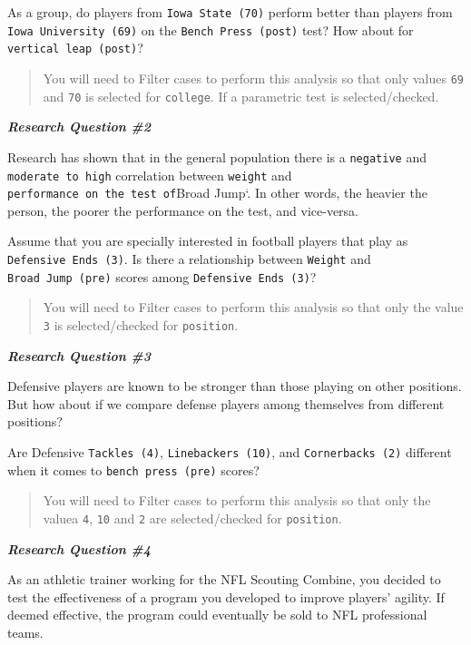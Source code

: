\documentclass[11pt,]{article}
\begin{document}
As a group, do players from \texttt{Iowa\ State\ (70)} perform better
than players from \texttt{Iowa\ University\ (69)} on the
\texttt{Bench\ Press\ (post)} test? How about for
\texttt{vertical\ leap\ (post)}?

\begin{quote}
You will need to Filter cases to perform this analysis so that only
values \texttt{69} and \texttt{70} is selected for \texttt{college}. If
a parametric test is selected/checked.
\end{quote}

\textbf{\emph{Research Question \#2}}

Research has shown that in the general population there is a
\texttt{negative} and \texttt{moderate\ to\ high} correlation between
\texttt{weight} and \texttt{performance\ on\ the\ test\ of}Broad Jump`.
In other words, the heavier the person, the poorer the performance on
the test, and vice-versa.

Assume that you are specially interested in football players that play
as \texttt{Defensive\ Ends\ (3)}. Is there a relationship between
\texttt{Weight} and \texttt{Broad\ Jump\ (pre)} scores among
\texttt{Defensive\ Ends\ (3)}?

\begin{quote}
You will need to Filter cases to perform this analysis so that only the
value \texttt{3} is selected/checked for \texttt{position}.
\end{quote}

\textbf{\emph{Research Question \#3}}

Defensive players are known to be stronger than those playing on other
positions. But how about if we compare defense players among themselves
from different positions?

Are Defensive \texttt{Tackles\ (4)}, \texttt{Linebackers\ (10)}, and
\texttt{Cornerbacks\ (2)} different when it comes to
\texttt{bench\ press\ (pre)} scores?

\begin{quote}
You will need to Filter cases to perform this analysis so that only the
valuea \texttt{4}, \texttt{10} and \texttt{2} are selected/checked for
\texttt{position}.
\end{quote}

\textbf{\emph{Research Question \#4}}

As an athletic trainer working for the NFL Scouting Combine, you decided
to test the effectiveness of a program you developed to improve players'
agility. If deemed effective, the program could eventually be sold to
NFL professional teams.
\end{document}
